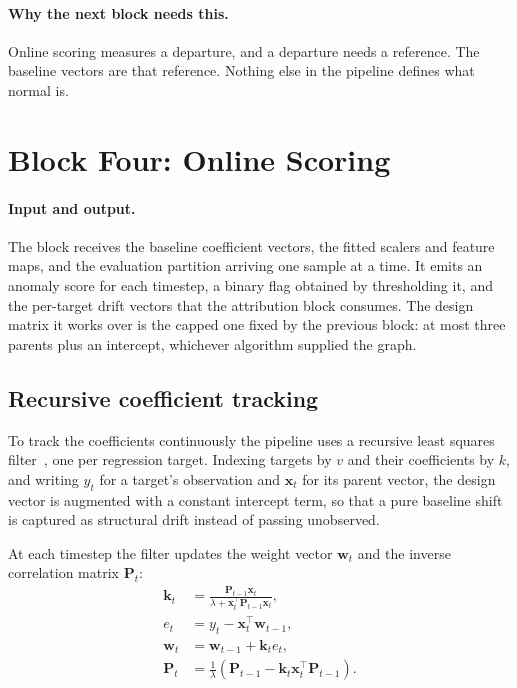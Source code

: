 \paragraph{Why the next block needs this.} Online scoring measures a departure, and a departure needs a reference. The baseline vectors are that reference. Nothing else in the pipeline defines what normal is.

\section{Block Four: Online Scoring}
\label{sec:method-scoring}

\paragraph{Input and output.} The block receives the baseline coefficient vectors, the fitted scalers and feature maps, and the evaluation partition arriving one sample at a time. It emits an anomaly score for each timestep, a binary flag obtained by thresholding it, and the per-target drift vectors that the attribution block consumes. The design matrix it works over is the capped one fixed by the previous block: at most three parents plus an intercept, whichever algorithm supplied the graph.

\subsection{Recursive coefficient tracking}
\label{sec:bg-scoring}

To track the coefficients continuously the pipeline uses a recursive least squares filter~\cite{haykin2002adaptive}, one per regression target. Indexing targets by $v$ and their coefficients by $k$, and writing $y_t$ for a target's observation and $\mathbf{x}_t$ for its parent vector, the design vector is augmented with a constant intercept term, so that a pure baseline shift is captured as structural drift instead of passing unobserved.

At each timestep the filter updates the weight vector $\mathbf{w}_t$ and the inverse correlation matrix $\mathbf{P}_t$:
\begin{align}
  \mathbf{k}_t &= \frac{\mathbf{P}_{t-1}\mathbf{x}_t}{\lambda + \mathbf{x}_t^{\top}\mathbf{P}_{t-1}\mathbf{x}_t}, \label{eq:rls-gain} \\
  e_t &= y_t - \mathbf{x}_t^{\top}\mathbf{w}_{t-1}, \label{eq:rls-error} \\
  \mathbf{w}_t &= \mathbf{w}_{t-1} + \mathbf{k}_t e_t, \label{eq:rls-weight} \\
  \mathbf{P}_t &= \frac{1}{\lambda}\left(\mathbf{P}_{t-1} - \mathbf{k}_t\mathbf{x}_t^{\top}\mathbf{P}_{t-1}\right). \label{eq:rls-cov}
\end{align}


